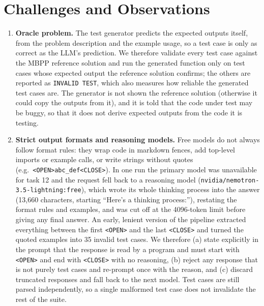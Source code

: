 \documentclass[12pt, a4paper]{article}
\begin{document}
\section{Challenges and Observations}

\begin{enumerate}
    \item \textbf{Oracle problem.} The test generator predicts the expected outputs itself, from the problem description and the example usage, so a test case is only as correct as the LLM's prediction. We therefore validate every test case against the MBPP reference solution and run the generated function only on test cases whose expected output the reference solution confirms; the others are reported as \texttt{INVALID TEST}, which also measures how reliable the generated test cases are. The generator is not shown the reference solution (otherwise it could copy the outputs from it), and it is told that the code under test may be buggy, so that it does not derive expected outputs from the code it is testing.

    \item \textbf{Strict output formats and reasoning models.} Free models do not always follow format rules: they wrap code in markdown fences, add top-level imports or example calls, or write strings without quotes (e.g.\ \texttt{<OPEN>abc\_def<CLOSE>}). In one run the primary model was unavailable for task 12 and the request fell back to a reasoning model (\texttt{nvidia/nemotron-3.5-lightning:free}), which wrote its whole thinking process into the answer (13{,}660 characters, starting ``Here's a thinking process:''), restating the format rules and examples, and was cut off at the 4096-token limit before giving any final answer. An early, lenient version of the pipeline extracted everything between the first \texttt{<OPEN>} and the last \texttt{<CLOSE>} and turned the quoted examples into 35 invalid test cases. We therefore (a) state explicitly in the prompt that the response is read by a program and must start with \texttt{<OPEN>} and end with \texttt{<CLOSE>} with no reasoning, (b) reject any response that is not purely test cases and re-prompt once with the reason, and (c) discard truncated responses and fall back to the next model. Test cases are still parsed independently, so a single malformed test case does not invalidate the rest of the suite.


\end{enumerate}
\end{document}
